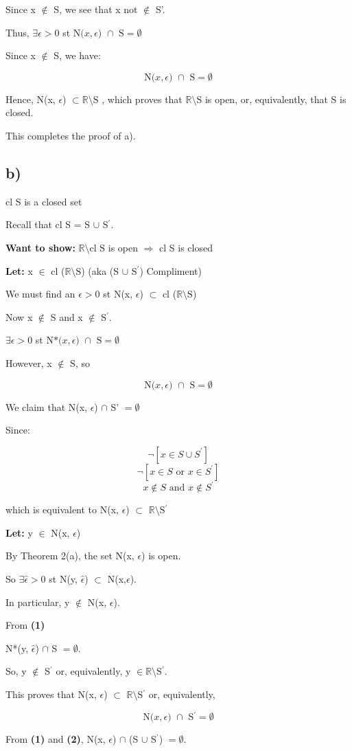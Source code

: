 \documentclass{article}
\newcommand\ssc[2][\DefaultOpt]{%
  \def\DefaultOpt{#2}%
  \subsection[#1]{#2}%
}
\newcommand{\lt}[1]{\textbf{Let: } #1}
\newcommand{\wts}[1]{\textbf{Want to show: } #1}
\newcommand{\bpth}[1]{\textbf{(#1)}}
\newcommand{\step}[2]{\begin{equation}\tag{#2}#1\end{equation}}
\newcommand{\br}{\mathbb{R}}       %
\newcommand{\ep}{\epsilon}         %
\newcommand{\es}{\emptyset}        %
\newcommand{\sbs}{\subset}         %
\newcommand{\rar}{\Rightarrow}     %
\newcommand{\pr}{^\prime} 		   %
\newcommand{\butnot}[2]{#1\setminus{\textrm{#2}}}
\newcommand{\nbhe}[3]{\textrm{N(}#1, #2\textrm{) }\cap \textrm{ #3} = \emptyset}
\newcommand{\dnbhe}[3]{\textrm{N*(}#1, #2\textrm{) }\cap \textrm{ #3} = \emptyset}
\begin{document}
Since x $\not\in$ S, we see that x not $\not\in$ S'.

Thus, $\exists \ep > 0$ st $\nbhe{x}{\epsilon}{S}$ \

Since x $\not\in$ S, we have:

\step{\nbhe{x}{\epsilon}{S}}{1}

Hence, N(x, $\ep$) $\sbs \butnot{\br}{S}$ , which proves that $\butnot{\br}{S}$ is open, or, equivalently, that S is closed. \

This completes the proof of a).

\ssc{b)}
cl S is a closed set \

Recall that cl S = S $\cup$ S$\pr$.

\wts{$\butnot{\br}{cl S}$ is open $\rar$ cl S is closed}

\lt{x $\in$ cl ($\butnot{\br}{S}$) (aka (S $\cup$ S$\pr$) Compliment)} \

We must find an $\ep > 0$ st N(x, $\ep$) $\subset$ cl ($\butnot{\br}{S}$) \

Now x $\not\in$ S and x $\not\in$ S$\pr$. \

$\exists \ep > 0$ st $\dnbhe{x}{\epsilon}{S}$ \

However, x $\not\in$ S, so \

\step{\nbhe{x}{\epsilon}{S}}{1}

We claim that N(x, $\ep$) $\cap$ S' $= \emptyset$ \

Since:

\[\neg [x \in S \cup S\pr]\]
\[\neg [x \in S \textrm{ or }x \in S\pr]\]
\[x \not\in S \textrm{ and }x \not\in S\pr\]

which is equivalent to N(x, $\ep$) $\sbs$ $\butnot{\br}{S$\pr$}$ \

\lt{y $\in$ N(x, $\ep$)}

By Theorem 2(a), the set N(x, $\ep$) is open. \

So $\exists \hat{\epsilon} > 0$ st N(y, $\hat{\epsilon}$) $\subset$ N(x,$\ep$). \

In particular, y $\not\in$ N(x, $\ep$). \

From \bpth{1} \

N*(y, $\hat{\epsilon}$) $\cap$ S $= \emptyset$. \

So, y $\not\in$ S$\pr$ or, equivalently, y $\in \butnot{\br}{S$\pr$}$.

This proves that N(x, $\ep$) $\subset$ $\butnot{\br}{S$\pr$}$ or, equivalently,

\step{\nbhe{x}{\epsilon}{S$\pr$}}{2}

From \bpth{1} and \bpth{2}, N(x, $\ep$) $\cap$ (S $\cup$ S$\pr$) $= \es$. \
\end{document}
